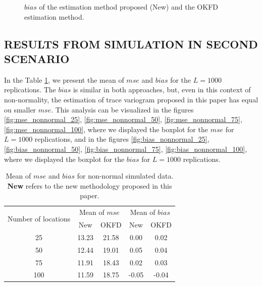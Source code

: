 \documentclass[
  12pt,
]{article}
\theoremstyle{definition}
\theoremstyle{definition}
\theoremstyle{definition}
\theoremstyle{remark}
\begin{document}
\begin{figure}[htbp]
  \caption{$bias$ of the estimation method proposed (New) and the OKFD estimation method.}
\end{figure}

\hypertarget{results-from-simulation-in-second-scenario}{%
\subsection*{RESULTS FROM SIMULATION IN SECOND SCENARIO}\label{results-from-simulation-in-second-scenario}}

In the Table \ref{tab:summary-nonnormal}, we present the mean of \(mse\) and \(bias\) for the \(L=1000\) replications. The \(bias\) is similar in both approaches, but, even in this context of non-normality, the estimation of trace variogram proposed in this paper has equal ou smaller \(mse\).
This analysis can be visualized in the figures \ref{fig:mse_nonnormal_25}, \ref{fig:mse_nonnormal_50}, \ref{fig:mse_nonnormal_75}, \ref{fig:mse_nonnormal_100}, where we displayed the boxplot for the \(mse\) for \(L=1000\) replications, and in the figures \ref{fig:bias_nonnormal_25}, \ref{fig:bias_nonnormal_50}, \ref{fig:bias_nonnormal_75}, \ref{fig:bias_nonnormal_100}, where we displayed the boxplot for the \(bias\) for \(L=1000\) replications.

\begin{table}[htbp]
  \centering
  \caption{Mean of $mse$ and $bias$ for non-normal simulated data. \textbf{New} refers to the new methodology proposed in this paper.}
    \begin{tabular}{ccc|cc}
    \toprule
    \multirow{2}{*}{Number of locations} & \multicolumn{2}{c}{Mean of $mse$} & \multicolumn{2}{|c}{Mean of $bias$} \\ \cmidrule{2-5}
          & New   & OKFD  & New   & OKFD \\  \midrule
    25    & 13.23 & 21.58 & 0.00  & 0.02 \\
    50    & 12.44 & 19.01 & 0.05  & 0.04 \\
    75    & 11.91 & 18.43 & 0.02  & 0.03 \\
    100   & 11.59 & 18.75 & -0.05 & -0.04 \\ \bottomrule
    \end{tabular}
  \label{tab:summary-nonnormal}
\end{table}
\end{document}
